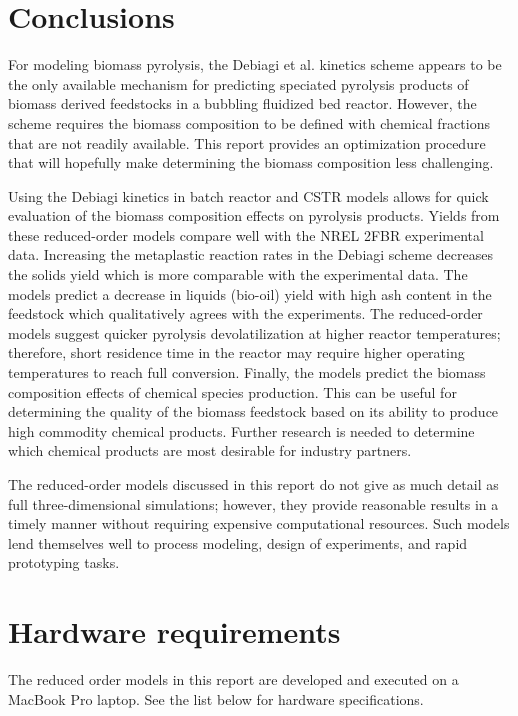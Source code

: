
\section{Conclusions}

For modeling biomass pyrolysis, the Debiagi et al. kinetics scheme appears to be the only available mechanism for predicting speciated pyrolysis products of biomass derived feedstocks in a bubbling fluidized bed reactor. However, the scheme requires the biomass composition to be defined with chemical fractions that are not readily available. This report provides an optimization procedure that will hopefully make determining the biomass composition less challenging.

Using the Debiagi kinetics in batch reactor and CSTR models allows for quick evaluation of the biomass composition effects on pyrolysis products. Yields from these reduced-order models compare well with the NREL 2FBR experimental data. Increasing the metaplastic reaction rates in the Debiagi scheme decreases the solids yield which is more comparable with the experimental data. The models predict a decrease in liquids (bio-oil) yield with high ash content in the feedstock which qualitatively agrees with the experiments. The reduced-order models suggest quicker pyrolysis devolatilization at higher reactor temperatures; therefore, short residence time in the reactor may require higher operating temperatures to reach full conversion. Finally, the models predict the biomass composition effects of chemical species production. This can be useful for determining the quality of the biomass feedstock based on its ability to produce high commodity chemical products. Further research is needed to determine which chemical products are most desirable for industry partners.

The reduced-order models discussed in this report do not give as much detail as full three-dimensional simulations; however, they provide reasonable results in a timely manner without requiring expensive computational resources. Such models lend themselves well to process modeling, design of experiments, and rapid prototyping tasks.

\section{Hardware requirements}

The reduced order models in this report are developed and executed on a MacBook Pro laptop. See the list below for hardware specifications.


